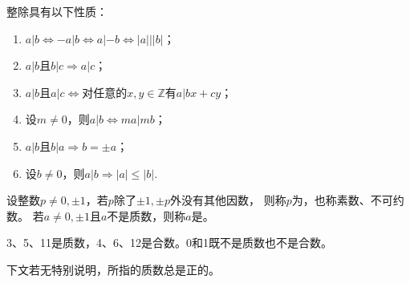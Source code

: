 \begin{theorem}\label{theorem:7.ex02.3}
    整除具有以下性质：
    \begin{enumerate}
        \item $a|b\Leftrightarrow -a|b \Leftrightarrow a|-b \Leftrightarrow |a|||b|$；
        \item $a|b$且$b|c \Rightarrow a|c$；
        \item $a|b$且$a|c \Leftrightarrow$对任意的$x,y\in\mathbb{Z}$有$a|bx+cy$；
        \item 设$m\neq0$，则$a|b\Leftrightarrow ma|mb$；
        \item $a|b$且$b|a\Rightarrow b=\pm a$；
        \item 设$b\neq0$，则$a|b\Rightarrow |a|\le|b|$.
    \end{enumerate}
\end{theorem}
\begin{definition}
    设整数$p\neq0,\pm1$，若$p$除了$\pm1,\pm p$外没有其他因数，
    则称$p$为，也称{\sffamily 素数}、{\sffamily 不可约数}。
    若$a\neq0,\pm1$且$a$不是质数，则称$a$是。
\end{definition}
\begin{example}
    3、5、11是质数，4、6、12是合数。0和1既不是质数也不是合数。
\end{example}
\begin{notation}
    下文若无特别说明，所指的质数总是正的。
\end{notation}
